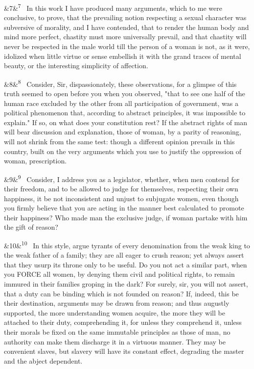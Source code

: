 \documentclass[12pt]{article}
\newcommand{\para}[1][]{\par\noindent\ifx&#1&\else\textsuperscript{\footnotesize #1}~\fi}
\begin{document}
\para[7] In this work I have produced many arguments, which to me were conclusive, to prove, that the prevailing notion respecting a sexual character was subversive of morality, and I have contended, that to render the human body and mind more perfect, chastity must more universally prevail, and that chastity will never be respected in the male world till the person of a woman is not, as it were, idolized when little virtue or sense embellish it with the grand traces of mental beauty, or the interesting simplicity of affection.

\para[8] Consider, Sir, dispassionately, these observations, for a glimpse of this truth seemed to open before you when you observed, "that to see one half of the human race excluded by the other from all participation of government, was a political phenomenon that, according to abstract principles, it was impossible to explain." If so, on what does your constitution rest? If the abstract rights of man will bear discussion and explanation, those of woman, by a parity of reasoning, will not shrink from the same test: though a different opinion prevails in this country, built on the very arguments which you use to justify the oppression of woman, prescription.

\para[9] Consider, I address you as a legislator, whether, when men contend for their freedom, and to be allowed to judge for themselves, respecting their own happiness, it be not inconsistent and unjust to subjugate women, even though you firmly believe that you are acting in the manner best calculated to promote their happiness? Who made man the exclusive judge, if woman partake with him the gift of reason?

\para[10] In this style, argue tyrants of every denomination from the weak king to the weak father of a family; they are all eager to crush reason; yet always assert that they usurp its throne only to be useful. Do you not act a similar part, when you FORCE all women, by denying them civil and political rights, to remain immured in their families groping in the dark? For surely, sir, you will not assert, that a duty can be binding which is not founded on reason? If, indeed, this be their destination, arguments may be drawn from reason; and thus augustly supported, the more understanding women acquire, the more they will be attached to their duty, comprehending it, for unless they comprehend it, unless their morals be fixed on the same immutable principles as those of man, no authority can make them discharge it in a virtuous manner. They may be convenient slaves, but slavery will have its constant effect, degrading the master and the abject dependent.
\end{document}
